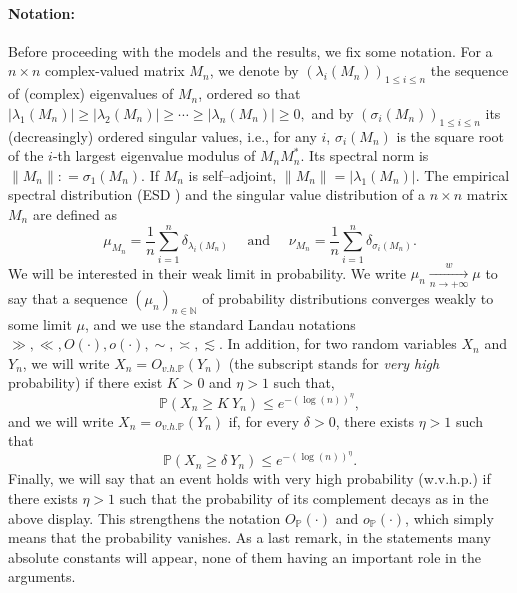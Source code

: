 \documentclass[11pt,oneside]{amsart}
\theoremstyle{plain}
\numberwithin{equation}{section}
\newcommand{\p}{\mathbb{P}}
\newcommand{\wconv}{\xrightarrow[\textit{n} \to +\infty]{\quad {w} \quad}}
\newcommand{\matrixx}{{M_n}}
\newcommand{\op}{o_{\p}}
\newcommand{\Op}{O_{\p}}
\newcommand{\ohp}{o_{v.h.\p}}
\newcommand{\Ohp}{O_{v.h.\p}}
\begin{document}
\paragraph{\bf Notation:} Before proceeding with the models and the results, we fix some notation.
For a $n \times n$ complex-valued matrix $\matrixx$, we denote by $(\lambda_i(\matrixx))_{1 \le i \le n}$ the sequence of (complex) eigenvalues of $\matrixx$, ordered so that 
$|\lambda_1(\matrixx)|\ge |\lambda_2(\matrixx)|\ge \cdots \ge |\lambda_n(\matrixx)|\ge 0,$
and by $(\sigma_i(\matrixx))_{1 \le i \le n}$ its (decreasingly) ordered singular values, i.e.,  for any $i$, $\sigma_i(\matrixx)$ is the square root of the $i$-th largest eigenvalue modulus of $M_nM_n^*$.
Its spectral norm is $\|\matrixx\|: = \sigma_{1}(\matrixx)$. 
If $\matrixx$ is self--adjoint, $\|\matrixx\|=|\lambda_{1}(\matrixx)|$.
The empirical spectral distribution (ESD ) and the singular value distribution of a $n \times n$ matrix $M_n$ are defined as 
\begin{equation*}
    \mu_{M_n}= \frac{1}{n}\sum_{i =1}^n \delta_{\lambda_i(M_n)} \quad \text{ and } \quad     \nu_{M_n}= \frac{1}{n}\sum_{i =1}^n \delta_{\sigma_i(M_n)}.
\end{equation*}
We will be interested in their weak limit in probability. We write $\mu_n \wconv \mu$ to say that a sequence $(\mu_n)_{n \in \mathbb{N}}$ of probability distributions converges weakly to some limit $\mu$, and we use the standard Landau notations $\gg , \ll, O(\cdot), o(\cdot),\sim,\asymp,\lesssim$. In addition, for two random variables $X_n$ and $Y_n$, we will write $X_n=\Ohp(Y_n)$ (the subscript stands for \textit{very high} probability) if there exist $K>0$ and $\eta>1$ such that, 
\begin{equation*}
    \p(X_n \ge K\ Y_n) \le e^{-(\log(n))^\eta},
\end{equation*}
and we will write $X_n=\ohp(Y_n)$ if, for every $\delta>0$, there exists $\eta>1$ such that
\begin{equation*}
    \p(X_n \ge \delta\ Y_n) \le e^{-(\log(n))^\eta}.
\end{equation*}
Finally, we will say that an event holds with very high probability (w.v.h.p.) if there exists $\eta>1$ such that the probability of its complement decays as in the above display. This strengthens the notation $\Op(\cdot)$ and $\op(\cdot)$, which simply means that the probability vanishes. As a last remark, in the statements many absolute constants will appear, none of them having an important role in the arguments.
\end{document}
